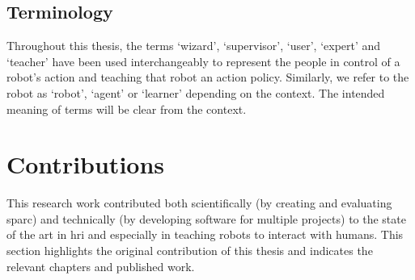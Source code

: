 \subsection{Terminology}

Throughout this thesis, the terms `wizard', `supervisor', `user', `expert' and `teacher' have been used interchangeably to represent the people in control of a robot's action and teaching that robot an action policy. Similarly, we refer to the robot as `robot', `agent' or `learner' depending on the context. The intended meaning of terms will be clear from the context.

%
%

\section{Contributions}\label{sec:intro_contr}

This research work contributed both scientifically (by creating and evaluating \gls{sparc}) and technically (by developing software for multiple projects) to the state of the art in \gls{hri} and especially in teaching robots to interact with humans. This section highlights the original contribution of this thesis and indicates the relevant chapters and published work.

